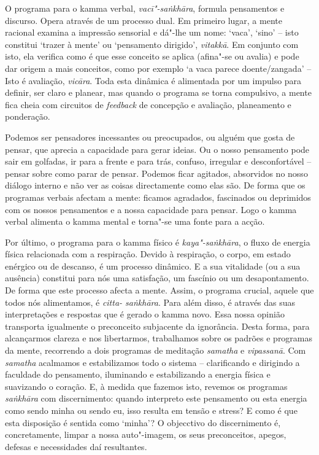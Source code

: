 O programa para o kamma verbal, \emph{vacī"-saṅkhāra}, formula pensamentos e
discurso. Opera através de um processo dual. Em primeiro lugar, a mente racional
examina a impressão sensorial e dá"-lhe um nome: `vaca', `sino' -- isto constitui
`trazer à mente' ou `pensamento dirigido', \emph{vitakkā}. Em conjunto com isto,
ela verifica como é que esse conceito se aplica (afina"-se ou avalia) e pode dar
origem a mais conceitos, como por exemplo `a vaca parece doente/zangada' -- Isto
é avaliação, \emph{vicāra}. Toda esta dinâmica é alimentada por um impulso para
definir, ser claro e planear, mas quando o programa se torna compulsivo, a mente
fica cheia com circuitos de \emph{feedback} de concepção e avaliação,
planeamento e ponderação.

\enlargethispage{\baselineskip}

Podemos ser pensadores incessantes ou preocupados, ou alguém que gosta de
pensar, que aprecia a capacidade para gerar ideias. Ou o nosso pensamento pode
sair em golfadas, ir para a frente e para trás, confuso, irregular e
desconfortável -- pensar sobre como parar de pensar. Podemos ficar agitados,
absorvidos no nosso diálogo interno e não ver as coisas directamente como elas
são. De forma que os programas verbais afectam a mente: ficamos agradados,
fascinados ou deprimidos com os nossos pensamentos e a nossa capacidade para
pensar. Logo o kamma verbal alimenta o kamma mental e torna"-se uma fonte para a
acção.

\enlargethispage{\baselineskip}

Por último, o programa para o kamma físico é \emph{kaya"-saṅkhāra}, o fluxo de
energia física relacionada com a respiração. Devido à respiração, o corpo, em
estado enérgico ou de descanso, é um processo dinâmico. E a sua vitalidade (ou a
sua ausência) constitui para nós uma satisfação, um fascínio ou um
desapontamento. De forma que este processo afecta a mente. Assim, o programa
crucial, aquele que todos nós alimentamos, é \emph{citta- saṅkhāra}. Para além
disso, é através das suas interpretações e respostas que é gerado o kamma novo.
Essa nossa opinião transporta igualmente o preconceito subjacente da ignorância.
Desta forma, para alcançarmos clareza e nos libertarmos, trabalhamos sobre os
padrões e programas da mente, recorrendo a dois programas de meditação
\emph{samatha} e \emph{vipassanā}. Com \emph{samatha} acalmamos e estabilizamos
todo o sistema -- clarificando e dirigindo a faculdade do pensamento, iluminando
e estabilizando a energia física e suavizando o coração. E, à medida que fazemos
isto, revemos os programas \emph{saṅkhāra} com discernimento: quando interpreto
este pensamento ou esta energia como sendo minha ou sendo eu, isso resulta em
tensão e stress? E como é que esta disposição é sentida como `minha'? O
objecctivo do discernimento é, concretamente, limpar a nossa auto"-imagem, os
seus preconceitos, apegos, defesas e necessidades daí resultantes.

